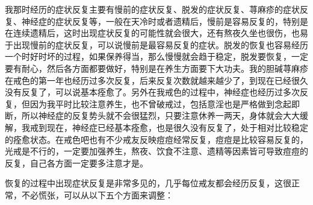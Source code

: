 \documentclass[fontset=founder]{ctexart}
\begin{document}
我那时经历的症状反复主要有慢前的症状反复、脱发的症状反复、荨麻疹的症状反复、神经症的症状反复等，一般在天冷时或者遗精后，慢前是容易反复的，特别是在连续遗精后，这时出现症状反复的可能性就会很大，还有熬夜久坐也很伤，也易于出现慢前的症状反复，可以说慢前是最容易反复的症状。脱发的恢复也容易经历一个时好时坏的过程，如果保养得当，那么慢慢就会趋于稳定，脱发要恢复，一定要有耐心，然后各方面都要做好，特别是在养生方面要下大功夫。我的胆碱荨麻疹在戒色的第一年也经历过多次反复，后来反复次数就越来越少了，到现在已经很久没有反复了，可以说基本痊愈了。另外在我戒色的过程中，神经症也经历过多次反复，但因为我平时比较注意养生，也不曾破戒过，包括意淫也是严格做到念起即断，所以神经症的反复势头就不会很猛烈，只要注意休养一两天，身体就会大大缓解，我戒到现在，神经症已经基本痊愈，也是很久没有反复了，处于相对比较稳定的痊愈状态。在戒色吧也有不少戒友反映痘痘经常反复，痘痘是比较容易反复的，光戒是不行的，一定要加强养生，熬夜、饮食不注意、遗精等因素皆可导致痘痘的反复，自己各方面一定要多注意才是。

恢复的过程中出现症状反复是非常多见的，几乎每位戒友都会经历反复，这很正常，不必慌张，可以从以下五个方面来调整：
\end{document}
